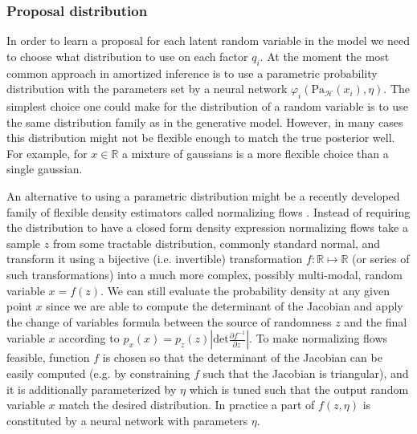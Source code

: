 \documentclass[12pt]{article}
\begin{document}
% 



\subsubsection*{Proposal distribution}

In order to learn a proposal for each latent random variable in the model we need to choose what distribution to use on each factor $q_i$.
At the moment the most common approach in amortized inference is to use a parametric probability distribution with the parameters set by a neural network $\varphi_i(\text{Pa}_\mathcal{H}(x_i), \eta)$.
The simplest choice one could make for the distribution of a random variable is to use the same distribution family as in the generative model.
However, in many cases this distribution might not be flexible enough to match the true posterior well.
For example, for $x \in \mathbb{R}$ a mixture of gaussians is a more flexible choice than a single gaussian.

An alternative to using a parametric distribution might be a recently developed family of flexible density estimators called normalizing flows \citep{RezendeMohamed2015,IAF,MAF}.
Instead of requiring the distribution to have a closed form density expression normalizing flows take a sample $z$ from some tractable distribution, commonly standard normal, and transform it using a bijective (i.e. invertible) transformation $f: \mathbb{R} \mapsto \mathbb{R}$ (or series of such transformations) into a much more complex, possibly multi-modal, random variable $x=f(z)$.
We can still evaluate the probability density at any given point $x$ since we are able to compute the determinant of the Jacobian and apply the change of variables formula between the source of randomness $z$ and the final variable $x$ according to 
$p_x(x) = p_z(z) \left|
    \mathrm{det} \frac{
      \partial f^{-1}
    }{
      \partial z\
    }
  \right|$.
To make normalizing flows feasible, function $f$ is chosen so that the determinant of the Jacobian can be easily computed (e.g. by constraining $f$ such that the Jacobian is triangular), and it is additionally parameterized by $\eta$ which is tuned such that the output random variable $x$ match the desired distribution. In practice a part of $f(z, \eta)$ is constituted by a neural network with parameters $\eta$.
\end{document}
